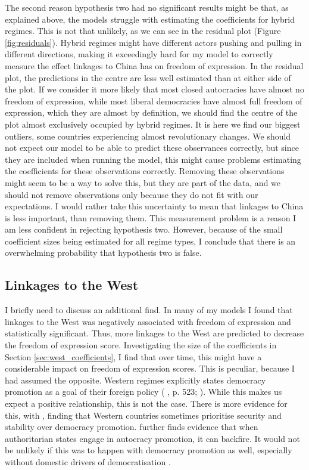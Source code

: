 The second reason hypothesis two had no significant results might be that, as explained above, the models struggle with estimating the coefficients for hybrid regimes. This is not that unlikely, as we can see in the residual plot (Figure \ref{fig:residuals}). Hybrid regimes might have different actors pushing and pulling in different directions, making it exceedingly hard for my model to correctly measure the effect linkages to China has on freedom of expression. In the residual plot, the predictions in the centre are less well estimated than at either side of the plot. If we consider it more likely that most closed autocracies have almost no freedom of expression, while most liberal democracies have almost full freedom of expression, which they are almost by definition, we should find the centre of the plot almost exclusively occupied by hybrid regimes. It is here we find our biggest outliers, some countries experiencing almost revolutionary changes. We should not expect our model to be able to predict these observances correctly, but since they are included when running the model, this might cause problems estimating the coefficients for these observations correctly. Removing these observations might seem to be a way to solve this, but they are part of the data, and we should not remove observations only because they do not fit with our expectations. I would rather take this uncertainty to mean that linkages to China is less important, than removing them. This measurement problem is a reason I am less confident in rejecting hypothesis two. However, because of the small coefficient sizes being estimated for all regime types, I conclude that there is an overwhelming probability that hypothesis two is false. 

\subsection{Linkages to the West}
I briefly need to discuss an additional find. In many of my models I found that linkages to the West was negatively associated with freedom of expression and statistically significant. Thus, more linkages to the West are predicted to decrease the freedom of expression score. Investigating the size of the coefficients in Section \ref{sec:west_coefficients}, I find that over time, this might have a considerable impact on freedom of expression scores. This is peculiar, because I had assumed the opposite. Western regimes explicitly states democracy promotion as a goal of their foreign policy (\citeauthor{borzel_noble_2015} \citeyear{borzel_noble_2015}, p. 523; \citeauthor{levitsky_linkage_2006} \citeyear{levitsky_linkage_2006}). While this makes us expect a positive relationship, this is not the case. There is more evidence for this, with \citet[pp. 523-524]{borzel_noble_2015}, \citet[pp. 464-466]{delcour_spoiler_2015} \citet{freyburg_local_2015} finding that Western countries sometimes prioritise security and stability over democracy promotion. \citep{delcour_spoiler_2015} further finds evidence that when authoritarian states engage in autocracy promotion, it can backfire. It would not be unlikely if this was to happen with democracy promotion as well, especially without domestic drivers of democratisation \citep{risse_democracy_2015}.

